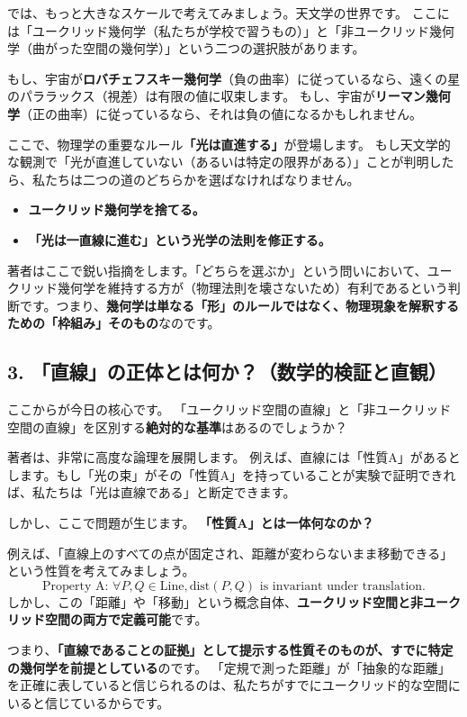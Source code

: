 \documentclass[a4paper,11pt,openany]{ltjsbook}
\begin{document}
\begin{lecturebox}
では、もっと大きなスケールで考えてみましょう。天文学の世界です。
ここには「ユークリッド幾何学（私たちが学校で習うもの）」と「非ユークリッド幾何学（曲がった空間の幾何学）」という二つの選択肢があります。

もし、宇宙が\textbf{ロバチェフスキー幾何学}（負の曲率）に従っているなら、遠くの星のパララックス（視差）は有限の値に収束します。
もし、宇宙が\textbf{リーマン幾何学}（正の曲率）に従っているなら、それは負の値になるかもしれません。

ここで、物理学の重要なルール\textbf{「光は直進する」}が登場します。
もし天文学的な観測で「光が直進していない（あるいは特定の限界がある）」ことが判明したら、私たちは二つの道のどちらかを選ばなければなりません。

\begin{itemize}[leftmargin=2em]
\item \textbf{ユークリッド幾何学を捨てる。}
\item \textbf{「光は一直線に進む」という光学の法則を修正する。}
\end{itemize}

著者はここで鋭い指摘をします。「どちらを選ぶか」という問いにおいて、ユークリッド幾何学を維持する方が（物理法則を壊さないため）有利であるという判断です。つまり、\textbf{幾何学は単なる「形」のルールではなく、物理現象を解釈するための「枠組み」そのもの}なのです。

\subsection*{3. 「直線」の正体とは何か？（数学的検証と直観）}

ここからが今日の核心です。
「ユークリッド空間の直線」と「非ユークリッド空間の直線」を区別する\textbf{絶対的な基準}はあるのでしょうか？

著者は、非常に高度な論理を展開します。
例えば、直線には「性質A」があるとします。もし「光の束」がその「性質A」を持っていることが実験で証明できれば、私たちは「光は直線である」と断定できます。

しかし、ここで問題が生じます。
\textbf{「性質A」とは一体何なのか？}

例えば、「直線上のすべての点が固定され、距離が変わらないまま移動できる」という性質を考えてみましょう。
$$ \text{Property A: } \forall P, Q \in \text{Line}, \text{dist}(P, Q) \text{ is invariant under translation.} $$
しかし、この「距離」や「移動」という概念自体、\textbf{ユークリッド空間と非ユークリッド空間の両方で定義可能}です。

つまり、\textbf{「直線であることの証拠」として提示する性質そのものが、すでに特定の幾何学を前提としている}のです。
「定規で測った距離」が「抽象的な距離」を正確に表していると信じられるのは、私たちがすでにユークリッド的な空間にいると信じているからです。


\end{lecturebox}
\end{document}
